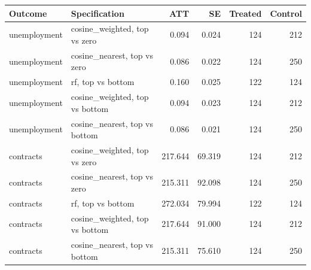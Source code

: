 \begin{tabular}{llrrrr}
\toprule
Outcome & Specification & ATT & SE & Treated & Control \\
\midrule
unemployment & cosine_weighted, top vs zero & 0.094 & 0.024 & 124 & 212 \\
unemployment & cosine_nearest, top vs zero & 0.086 & 0.022 & 124 & 250 \\
unemployment & rf, top vs bottom & 0.160 & 0.025 & 122 & 124 \\
unemployment & cosine_weighted, top vs bottom & 0.094 & 0.023 & 124 & 212 \\
unemployment & cosine_nearest, top vs bottom & 0.086 & 0.021 & 124 & 250 \\
contracts & cosine_weighted, top vs zero & 217.644 & 69.319 & 124 & 212 \\
contracts & cosine_nearest, top vs zero & 215.311 & 92.098 & 124 & 250 \\
contracts & rf, top vs bottom & 272.034 & 79.994 & 122 & 124 \\
contracts & cosine_weighted, top vs bottom & 217.644 & 91.000 & 124 & 212 \\
contracts & cosine_nearest, top vs bottom & 215.311 & 75.610 & 124 & 250 \\
\bottomrule
\end{tabular}
